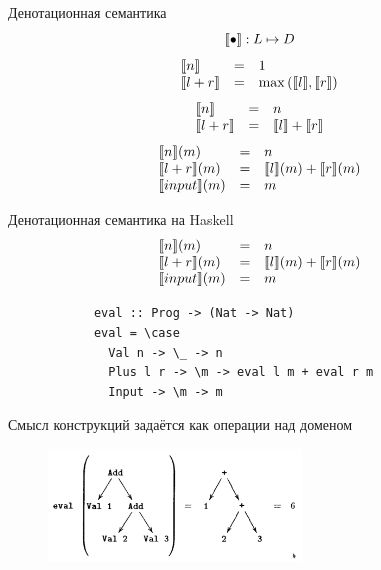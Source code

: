     \begin{frame}[fragile]{Денотационная семантика}
        \pause
        \[
            \llbracket{\bullet}\rrbracket : L \mapsto D
        \]
        \pause
        \[
            \begin{array}{lcl}
                \llbracket{n}\rrbracket     & = & 1                            \\
                \llbracket{l + r}\rrbracket & = & \max{(\llbracket{l}\rrbracket, \llbracket{r}\rrbracket)}
            \end{array}
        \]
        \pause
        \[
            \begin{array}{lcl}
                \llbracket{n}\rrbracket     & = & n                     \\
                \llbracket{l + r}\rrbracket & = & \llbracket{l}\rrbracket + \llbracket{r}\rrbracket
            \end{array}
        \]
        \pause
        \[
            \begin{array}{lcl}
                \llbracket{n}\rrbracket(m)     & = & n                           \\
                \llbracket{l + r}\rrbracket(m) & = & \llbracket{l}\rrbracket(m) + \llbracket{r}\rrbracket(m) \\
                \llbracket{input}\rrbracket(m) & = & m
            \end{array}
        \]
    \end{frame}

    \begin{frame}[fragile]{Денотационная семантика на Haskell}
        \pause
        \[
            \begin{array}{lcl}
                \llbracket{n}\rrbracket(m)     & = & n                           \\
                \llbracket{l + r}\rrbracket(m) & = & \llbracket{l}\rrbracket(m) + \llbracket{r}\rrbracket(m) \\
                \llbracket{input}\rrbracket(m) & = & m
            \end{array}
        \]
        \pause
        \begin{verbatim}
            eval :: Prog -> (Nat -> Nat)
            eval = \case
              Val n -> \_ -> n
              Plus l r -> \m -> eval l m + eval r m
              Input -> \m -> m
        \end{verbatim}
    \end{frame}

    \begin{frame}[fragile]{Смысл конструкций задаётся как операции над доменом}
        \begin{figure}[h]
            \centering
            \includegraphics[width=0.6\textwidth]{figs/eval-prog}
        \end{figure}
    \end{frame}

